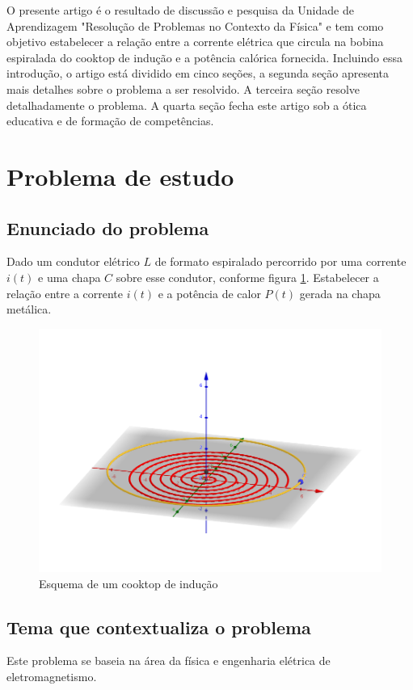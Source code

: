 \documentclass[
	article,			%
	11pt,				%
	oneside,			%
	a4paper,			%
	english,			%
	brazil,				%
	sumario=tradicional
	]{abntex2}
\begin{document}
O presente artigo é o resultado de discussão e pesquisa da Unidade de Aprendizagem "Resolução de Problemas no Contexto da Física" e tem como objetivo estabelecer a relação entre a corrente elétrica que circula na bobina espiralada do cooktop de indução e a potência calórica fornecida. Incluindo essa introdução, o artigo está dividido em cinco seções, a segunda seção apresenta mais detalhes sobre o problema a ser resolvido. A terceira seção resolve detalhadamente o problema. A quarta seção fecha este artigo sob a ótica educativa e de formação de competências.

\section{Problema de estudo}

\subsection{Enunciado do problema}

Dado um condutor elétrico $ L $ de formato espiralado percorrido por uma corrente $ i(t) $ e uma chapa $ C $ sobre esse condutor, conforme figura \ref{fig:fig1}. Estabelecer a relação entre a corrente $ i(t) $ e a potência de calor $ P(t) $ gerada na chapa metálica.

\begin{figure}[h]
	\centering
	\includegraphics[width=0.7\linewidth]{figures/fig1}
	\caption[Esquema de um cooktop de indução]{Esquema de um cooktop de indução}
	\label{fig:fig1}
\end{figure}

\subsection{Tema que contextualiza o problema}

Este problema se baseia na área da física e engenharia elétrica de eletromagnetismo.
\end{document}
